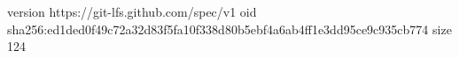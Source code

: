 version https://git-lfs.github.com/spec/v1
oid sha256:ed1ded0f49c72a32d83f5fa10f338d80b5ebf4a6ab4ff1e3dd95ce9c935cb774
size 124
